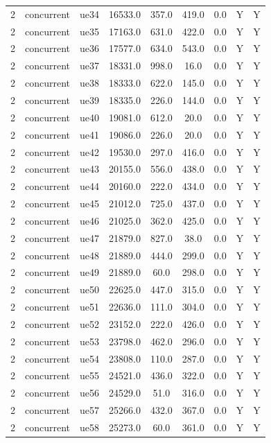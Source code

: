 \begin{table}[ht]
\begin{tabular}{|c|c|c|c|c|c|c|c|c|}
2 & concurrent & ue34 & 16533.0 & 357.0 & 419.0 & 0.0 & Y & Y \\
2 & concurrent & ue35 & 17163.0 & 631.0 & 422.0 & 0.0 & Y & Y \\
2 & concurrent & ue36 & 17577.0 & 634.0 & 543.0 & 0.0 & Y & Y \\
2 & concurrent & ue37 & 18331.0 & 998.0 & 16.0 & 0.0 & Y & Y \\
2 & concurrent & ue38 & 18333.0 & 622.0 & 145.0 & 0.0 & Y & Y \\
2 & concurrent & ue39 & 18335.0 & 226.0 & 144.0 & 0.0 & Y & Y \\
2 & concurrent & ue40 & 19081.0 & 612.0 & 20.0 & 0.0 & Y & Y \\
2 & concurrent & ue41 & 19086.0 & 226.0 & 20.0 & 0.0 & Y & Y \\
2 & concurrent & ue42 & 19530.0 & 297.0 & 416.0 & 0.0 & Y & Y \\
2 & concurrent & ue43 & 20155.0 & 556.0 & 438.0 & 0.0 & Y & Y \\
2 & concurrent & ue44 & 20160.0 & 222.0 & 434.0 & 0.0 & Y & Y \\
2 & concurrent & ue45 & 21012.0 & 725.0 & 437.0 & 0.0 & Y & Y \\
2 & concurrent & ue46 & 21025.0 & 362.0 & 425.0 & 0.0 & Y & Y \\
2 & concurrent & ue47 & 21879.0 & 827.0 & 38.0 & 0.0 & Y & Y \\
2 & concurrent & ue48 & 21889.0 & 444.0 & 299.0 & 0.0 & Y & Y \\
2 & concurrent & ue49 & 21889.0 & 60.0 & 298.0 & 0.0 & Y & Y \\
2 & concurrent & ue50 & 22625.0 & 447.0 & 315.0 & 0.0 & Y & Y \\
2 & concurrent & ue51 & 22636.0 & 111.0 & 304.0 & 0.0 & Y & Y \\
2 & concurrent & ue52 & 23152.0 & 222.0 & 426.0 & 0.0 & Y & Y \\
2 & concurrent & ue53 & 23798.0 & 462.0 & 296.0 & 0.0 & Y & Y \\
2 & concurrent & ue54 & 23808.0 & 110.0 & 287.0 & 0.0 & Y & Y \\
2 & concurrent & ue55 & 24521.0 & 436.0 & 322.0 & 0.0 & Y & Y \\
2 & concurrent & ue56 & 24529.0 & 51.0 & 316.0 & 0.0 & Y & Y \\
2 & concurrent & ue57 & 25266.0 & 432.0 & 367.0 & 0.0 & Y & Y \\
2 & concurrent & ue58 & 25273.0 & 60.0 & 361.0 & 0.0 & Y & Y \\

\end{tabular}
\end{table}
